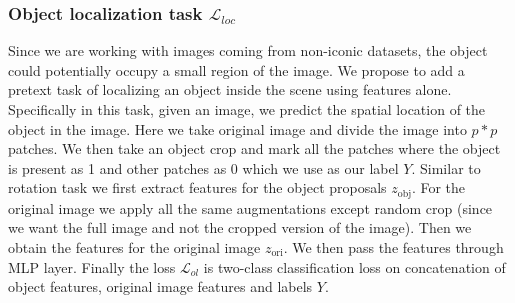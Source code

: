 

\subsubsection{Object localization task $\mathcal{L}_{loc}$ }
Since we are working with images coming from non-iconic datasets, the object could potentially occupy a small region of the image. We propose to add a pretext task of localizing an object inside the scene using features alone. Specifically in this task, given an image, we predict the spatial location of the object in the image. Here we take  original image and divide the image into $p * p$ patches. We then take an object crop and mark all the patches where the object is present as 1 and other patches as 0 which we use as our label $Y$. 
Similar to rotation task we first extract features for the object proposals $z_{\text{obj}}$. For the original image we apply all the same augmentations except random crop (since we want the full image and not the cropped version of the image). Then we obtain the features for the original image $z_{\text{ori}}$. We then pass the features through MLP layer. Finally the loss  $\mathcal{L}_{ol}$ is two-class classification loss on concatenation of object features, original image features and labels $Y$.

